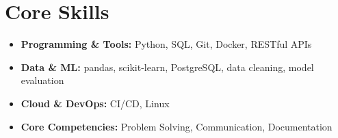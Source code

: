 \documentclass[10pt, letterpaper]{article}
\begin{document}
\section*{Core Skills}


\begin{small}
\begin{itemize}[leftmargin=*]
  \item \textbf{Programming \& Tools:} Python, SQL, Git, Docker, RESTful APIs
  \item \textbf{Data \& ML:} pandas, scikit-learn, PostgreSQL, data cleaning, model evaluation
  \item \textbf{Cloud \& DevOps:} CI/CD, Linux
  \item \textbf{Core Competencies:} Problem Solving, Communication, Documentation
\end{itemize}
\end{small}
\end{document}
